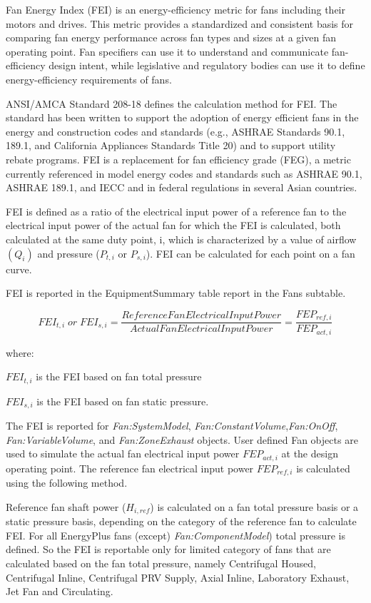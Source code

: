 Fan Energy Index (FEI) is an energy-efficiency metric for fans including their motors and drives. This metric provides a standardized and consistent basis for comparing fan energy performance across fan types and sizes at a given fan operating point. Fan specifiers can use it to understand and communicate fan-efficiency design intent, while legislative and regulatory bodies can use it to define energy-efficiency requirements of fans.

ANSI/AMCA Standard 208-18 defines the calculation method for FEI. The standard has been written to support the adoption of energy efficient fans in the energy and construction codes and standards (e.g., ASHRAE Standards 90.1, 189.1, and California Appliances Standards Title 20) and to support utility rebate programs. FEI is a replacement for fan efficiency grade (FEG), a metric currently referenced in model energy codes and standards such as ASHRAE 90.1, ASHRAE 189.1, and IECC and in federal regulations in several Asian countries.

FEI is defined as a ratio of the electrical input power of a reference fan to the electrical input power of the actual fan for which the FEI is calculated, both calculated at the same duty point, i, which is characterized by a value of airflow \((Q_i)\) and pressure (\(P_{t,i}\) or \(P_{s,i}\)). FEI can be calculated for each point on a fan curve.

FEI is reported in the EquipmentSummary table report in the Fans subtable.

\begin{equation}
FEI_{t,i}\;or\;FEI_{s,i}=\frac{Reference Fan Electrical Input Power}{Actual Fan Electrical Input Power} = \frac{FEP_{ref,i}}{FEP_{act,i}}
\label{eq:fei_calculation}
\end{equation}

where:

\(FEI_{t,i}\) is the FEI based on fan total pressure

\(FEI_{s,i}\) is the FEI based on fan static pressure.

The FEI is reported for \emph{Fan:SystemModel}, \emph{Fan:ConstantVolume},\emph{Fan:OnOff}, \emph{Fan:VariableVolume}, and \emph{Fan:ZoneExhaust} objects. User defined Fan objects are used to simulate the actual fan electrical input power \(FEP_{act,i}\) at the design operating point. The reference fan electrical input power \(FEP_{ref,i}\) is calculated using the following method.

Reference fan shaft power (\(H_{i,ref}\)) is calculated on a fan total pressure basis or a static pressure basis, depending on the category of the reference fan to calculate FEI. For all EnergyPlus fans (except) \emph{Fan:ComponentModel}) total pressure is defined. So the FEI is reportable only for limited category of fans that are calculated based on the fan total pressure, namely Centrifugal Housed, Centrifugal Inline, Centrifugal PRV Supply, Axial Inline, Laboratory Exhaust, Jet Fan and Circulating.

